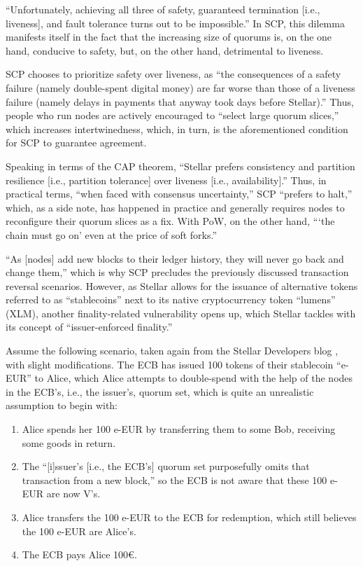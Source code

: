 ``Unfortunately, achieving all three of safety, guaranteed termination [i.e., liveness], and fault tolerance turns out to be impossible.'' \autocite{mazieres2019safetyvsliveness}
In SCP, this dilemma manifests itself in the fact that the increasing size of quorums is, on the one hand, conducive to safety, but, on the other hand, detrimental to liveness. \autocite{mazieres2019safetyvsliveness}

SCP chooses to prioritize safety over liveness, as ``the consequences of a safety failure (namely double-spent digital money) are far worse than those of a liveness failure (namely delays in payments that anyway took days before Stellar).'' \autocite[4]{lokhava2019}
Thus, people who run nodes are actively encouraged to ``select large quorum slices,'' which increases intertwinedness, which, in turn, is the aforementioned condition for SCP to guarantee agreement. \autocite[4]{lokhava2019}

Speaking in terms of the CAP theorem, ``Stellar prefers consistency and partition resilience [i.e., partition tolerance] over liveness [i.e., availability].'' \autocite{stellar2019networkhalt}
Thus, in practical terms, ``when faced with consensus uncertainty,'' SCP ``prefers to halt,'' which, as a side note, has happened in practice and generally requires nodes to reconfigure their quorum slices as a fix. \autocite{stellar2019networkhalt}
With PoW, on the other hand, \enquote{\enquote{the chain must go on} even at the price of soft forks.} \autocite{stellar2019networkhalt}

``As [nodes] add new blocks to their ledger history, they will never go back and change them,'' \autocite{stellar2020ief} which is why SCP precludes the previously discussed transaction reversal scenarios.
However, as Stellar allows for the issuance of alternative tokens referred to as ``stablecoins'' next to its native cryptocurrency token ``lumens'' (XLM), another finality-related vulnerability opens up, which Stellar tackles with its concept of ``issuer-enforced finality.'' \autocite{stellar2020ief}

Assume the following scenario, taken again from the Stellar Developers blog \autocite{stellar2020ief}, with slight modifications.
The ECB has issued 100 tokens of their stablecoin ``e-EUR'' to Alice, which Alice attempts to double-spend with the help of the nodes in the ECB's, i.e., the issuer's, quorum set, which is quite an unrealistic assumption to begin with: \autocite{stellar2020ief}

\begin{enumerate}
	\item
		Alice spends her 100 e-EUR by transferring them to some Bob, receiving some goods in return.
	\item
		The ``[i]ssuer’s [i.e., the ECB's] quorum set purposefully omits that transaction from a new block,'' so the ECB is not aware that these 100 e-EUR are now V's.
	\item
		Alice transfers the 100 e-EUR to the ECB for redemption, which still believes the 100 e-EUR are Alice's.
	\item
		The ECB pays Alice 100€.
\end{enumerate}

